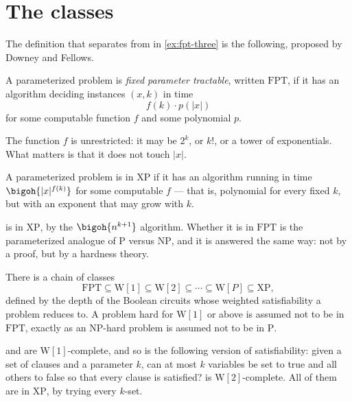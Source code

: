 \section{The classes}
\label{sec:fpt-classes}

The definition that separates  from  in
\cref{ex:fpt-three} is the following, proposed by Downey and Fellows.

\begin{definition}[FPT]\label{def:fpt}
A parameterized problem is \emph{fixed parameter tractable}, written
$\mathrm{FPT}$, if it has an algorithm deciding instances $(x,k)$ in time
\[ f(k) \cdot p(|x|) \]
for some computable function $f$ and some polynomial $p$.
\end{definition}

The function $f$ is unrestricted: it may be $2^k$, or $k!$, or a tower of
exponentials. What matters is that it does not touch $|x|$.

\begin{definition}[XP]\label{def:xp}
A parameterized problem is in $\mathrm{XP}$ if it has an algorithm running in
time $\bigoh{|x|^{f(k)}}$ for some computable $f$ --- that is, polynomial for
every fixed $k$, but with an exponent that may grow with $k$.
\end{definition}

 is in $\mathrm{XP}$, by the $\bigoh{n^{k+1}}$ algorithm. Whether
it is in $\mathrm{FPT}$ is the parameterized analogue of
$\mathrm{P}$ versus $\mathrm{NP}$, and it is answered the same way: not by a
proof, but by a hardness theory.

\begin{definition}\label{def:w-hierarchy}
There is a chain of classes
\[ \mathrm{FPT} \subseteq \mathrm{W}[1] \subseteq \mathrm{W}[2] \subseteq
   \cdots \subseteq \mathrm{W}[P] \subseteq \mathrm{XP}, \]
defined by the depth of the Boolean circuits whose weighted satisfiability a
problem reduces to. A problem hard for $\mathrm{W}[1]$ or above is assumed not
to be in $\mathrm{FPT}$, exactly as an \textrm{NP}-hard problem is assumed not
to be in $\mathrm{P}$.
\end{definition}

 and  are $\mathrm{W}[1]$-complete, and so
is the following version of satisfiability: given a set of clauses and a
parameter $k$, can at most $k$ variables be set to true and all others to false
so that every clause is satisfied?  is
$\mathrm{W}[2]$-complete. All of them are in $\mathrm{XP}$, by trying every
$k$-set.

